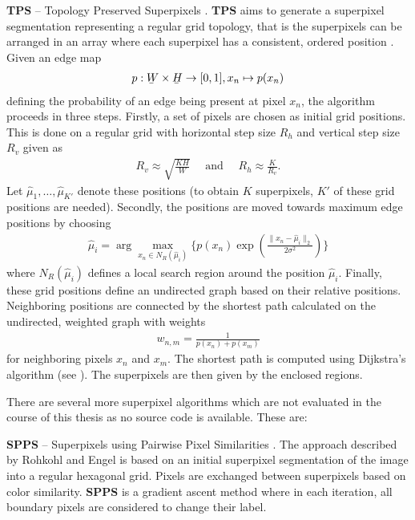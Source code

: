 \textbf{TPS} -- Topology Preserved Superpixels \cite{DaiTangHuazhaFuXiaochunCao:2012}. \textbf{TPS} aims to generate a superpixel segmentation representing a regular grid topology, that is the superpixels can be arranged in an array where each superpixel has a consistent, ordered position \cite{MoorePrinceWarrellMohammedJones:2008}. Given an edge map
\begin{align}
	p: \ubar{W} \times \ubar{H} \rightarrow [0,1], x_n \mapsto p(x_n)
\end{align}
defining the probability of an edge being present at pixel $x_n$, the algorithm proceeds in three steps. Firstly, a set of pixels are chosen as initial grid positions. This is done on a regular grid with horizontal step size $R_h$ and vertical step size $R_v$ given as
\begin{align}
	R_v \approx \sqrt{\frac{KH}{W}}\quad\text{ and }\quad R_h \approx \frac{K}{R_v}.
\end{align}
Let $\hat{\mu}_1, \ldots, \hat{\mu}_{K'}$ denote these positions (to obtain $K$ superpixels, $K'$ of these grid positions are needed). Secondly, the positions are moved towards maximum edge positions by choosing
\begin{align}
	\hat{\mu}_i = \arg \max_{x_n \in N_R(\hat{\mu}_i)} \{p(x_n) \exp\left(\frac{\|x_n - \hat{\mu}_i\|_2}{2\sigma^2}\right)\}
\end{align}
where $ N_R(\hat{\mu}_i)$ defines a local search region around the position $\hat{\mu}_i$.
Finally, these grid positions define an undirected graph based on their relative positions. Neighboring positions are connected by the shortest path calculated on the undirected, weighted graph with weights
\begin{align}
	w_{n,m} = \frac{1}{p(x_n) + p(x_m)}
\end{align}
for neighboring pixels $x_n$ and $x_m$. The shortest path is computed using Dijkstra's algorithm (\eg see \cite{CormenLeisersonRivestStein:2009}). The superpixels are then given by the enclosed regions.

There are several more superpixel algorithms which are not evaluated in the course of this thesis as no source code is available.%
These are:

\textbf{SPPS} -- Superpixels using Pairwise Pixel Similarities \cite{RohkohlEngel:2007}. The approach described by Rohkohl and Engel is based on an initial superpixel segmentation of the image into a regular hexagonal grid. Pixels are exchanged between superpixels based on color similarity. \textbf{SPPS} is a gradient ascent method where in each iteration, all boundary pixels are considered to change their label.

